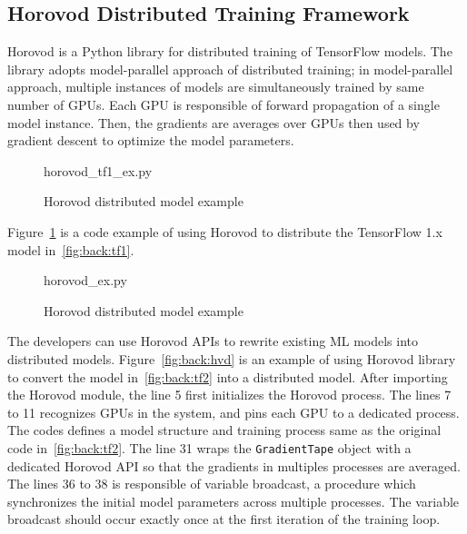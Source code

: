 \subsection{Horovod Distributed Training Framework}



Horovod is a Python library for distributed training of TensorFlow models.
The library adopts model-parallel approach of distributed training;
in model-parallel approach, multiple instances of models are simultaneously
trained by same number of GPUs.
Each GPU is responsible of forward propagation of a single model instance.
Then, the gradients are averages over GPUs then used by gradient descent
to optimize the model parameters. 

\begin{figure}[ht!]
 
{horovod_tf1_ex.py}
  \caption{Horovod distributed model example}
\label{fig:back:hvd1} 
\end{figure}

Figure~\ref{fig:back:hvd1} is a code example of using Horovod to distribute
the TensorFlow 1.x model in~\ref{fig:back:tf1}.

\begin{figure}[ht!]
 
{horovod_ex.py}
  \caption{Horovod distributed model example}
\label{fig:back:hvd2} 
\end{figure}


The developers can use Horovod APIs to rewrite existing ML models into
distributed models.
Figure~\ref{fig:back:hvd} is an example of using Horovod library to convert
the model in~\ref{fig:back:tf2} into a distributed model.
After importing the Horovod module, the line 5 first initializes the
Horovod process. 
The lines 7 to 11 recognizes GPUs in the system, and pins each GPU to
a dedicated process.
The codes defines a model structure and training process same as the original
code in~\ref{fig:back:tf2}.
The line 31 wraps the {\tt GradientTape} object with a dedicated 
Horovod API so that the gradients in multiples processes are averaged.
The lines 36 to 38 is responsible of variable broadcast, a procedure which
synchronizes the initial model parameters across multiple processes.
The variable broadcast should occur exactly once at the first iteration of
the training loop.
